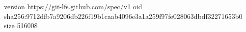 version https://git-lfs.github.com/spec/v1
oid sha256:9712dfb7a9206db226f19b1caab4096e3a1a259f97fe028063dbdf32271653b0
size 516008
